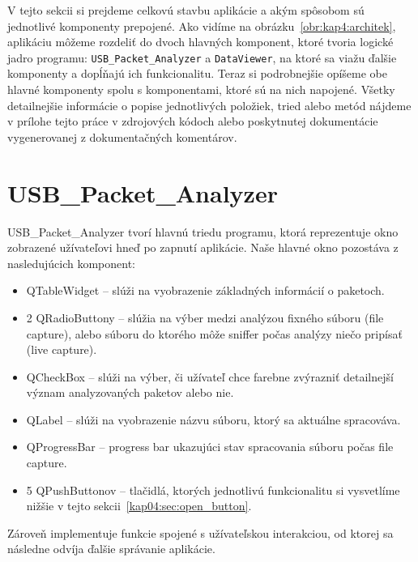 V tejto sekcii si prejdeme celkovú stavbu aplikácie a akým spôsobom sú jednotlivé komponenty prepojené. Ako vidíme na obrázku~\ref{obr:kap4:architek}, aplikáciu môžeme rozdeliť do dvoch hlavných komponent, ktoré tvoria logické jadro programu: \texttt{USB\_Packet\_Analyzer} a \texttt{DataViewer}, na ktoré sa viažu ďalšie komponenty a dopĺňajú ich funkcionalitu. Teraz si podrobnejšie opíšeme obe hlavné komponenty spolu s komponentami, ktoré sú na nich napojené. Všetky detailnejšie informácie o popise jednotlivých položiek, tried alebo metód nájdeme v prílohe tejto práce v zdrojových kódoch alebo poskytnutej dokumentácie vygenerovanej z dokumentačných komentárov.

\section{USB\_Packet\_Analyzer}

USB\_Packet\_Analyzer tvorí hlavnú triedu programu, ktorá reprezentuje ok\-no zobrazené užívateľovi hneď po zapnutí aplikácie. Naše hlavné okno pozostáva z nasledujúcich komponent:
\begin{itemize}
\item QTableWidget -- slúži na vyobrazenie základných informácií o paketoch.
\item 2 QRadioButtony -- slúžia na výber medzi analýzou fixného súboru (file capture), alebo súboru do ktorého môže sniffer počas analýzy niečo pripísať (live capture).
\item QCheckBox -- slúži na výber, či užívateľ chce farebne zvýrazniť detailnejší význam analyzovaných paketov alebo nie.
\item QLabel -- slúži na vyobrazenie názvu súboru, ktorý sa aktuálne spracováva.
\item QProgressBar -- progress bar ukazujúci stav spracovania súboru počas file capture.
\item 5 QPushButtonov -- tlačidlá, ktorých jednotlivú funkcionalitu si vysvetlíme nižšie v tejto sekcii~\ref{kap04:sec:open_button}.
\end{itemize}
Zároveň implementuje funkcie spojené s užívateľskou interakciou, od ktorej sa následne odvíja ďalšie správanie aplikácie.

